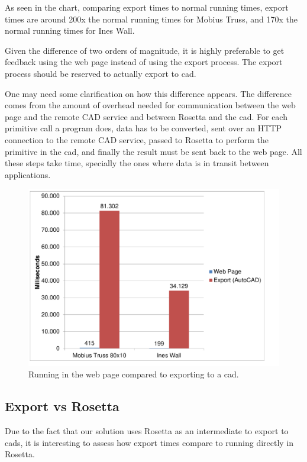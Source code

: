 As seen in the chart, comparing export times to normal running times, export times are around 200x the normal running times for Mobius Truss, and 170x the normal running times for Ines Wall.

Given the difference of two orders of magnitude, it is highly preferable to get feedback using the web page instead of using the export process.
The export process should be reserved to actually export to \gls{cad}.

One may need some clarification on how this difference appears.
The difference comes from the amount of overhead needed for communication between the web page and the remote CAD service and between Rosetta and the \gls{cad}.
For each primitive call a program does, data has to be converted, sent over an HTTP connection to the remote CAD service, passed to Rosetta to perform the primitive in the \gls{cad}, and finally the result must be sent back to the web page.
All these steps take time, specially the ones where data is in transit between applications.

\begin{figure}
  \centering
  \includegraphics[width=12cm]{./images/local_remote_timing}
  \caption{Running in the web page compared to exporting to a \gls{cad}.}
  \label{fig:local:remote:timing}
\end{figure}


\subsection{Export vs Rosetta}
Due to the fact that our solution uses Rosetta as an intermediate to export to \glspl{cad}, it is interesting to assess how export times compare to running directly in Rosetta.

